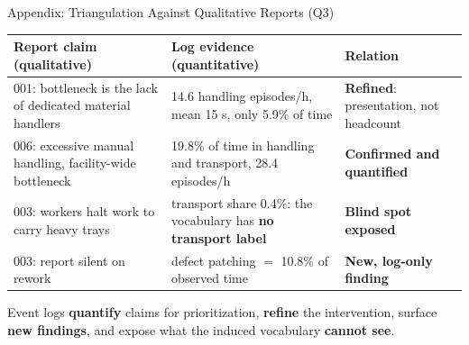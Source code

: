 \documentclass[aspectratio=169]{beamer}
\newcommand{\keyc}[1]{\textbf{\textcolor{egoblue}{#1}}}
\newcommand{\keyg}[1]{\textbf{\textcolor{egogreen!70!black}{#1}}}
\newcommand{\keya}[1]{\textbf{\textcolor{egoamber!85!black}{#1}}}
\begin{document}
\begin{frame}{Appendix: Triangulation Against Qualitative Reports (Q3)}
  \begin{center}
  \footnotesize
  \begin{tabular}{p{}p{}p{}}
    \toprule
    Report claim (qualitative) & Log evidence (quantitative) & Relation \\
    \midrule
    001: bottleneck is the lack of dedicated material handlers &
      14.6 handling episodes/h, mean 15 s, only 5.9\% of time &
      \keyc{Refined}: presentation, not headcount \\
    006: excessive manual handling, facility-wide bottleneck &
      19.8\% of time in handling and transport, 28.4 episodes/h &
      \keyg{Confirmed and quantified} \\
    003: workers halt work to carry heavy trays &
      transport share 0.4\%: the vocabulary has \keya{no transport label} &
      \keya{Blind spot exposed} \\
    003: report silent on rework &
      defect patching $=$ 10.8\% of observed time &
      \keyg{New, log-only finding} \\
    \bottomrule
  \end{tabular}
  \end{center}
  \vspace{2mm}
  \small Event logs \keyg{quantify} claims for prioritization,
  \keyc{refine} the intervention, surface \keyg{new findings},
  and expose what the induced vocabulary \keya{cannot see}.
\end{frame}
\end{document}
